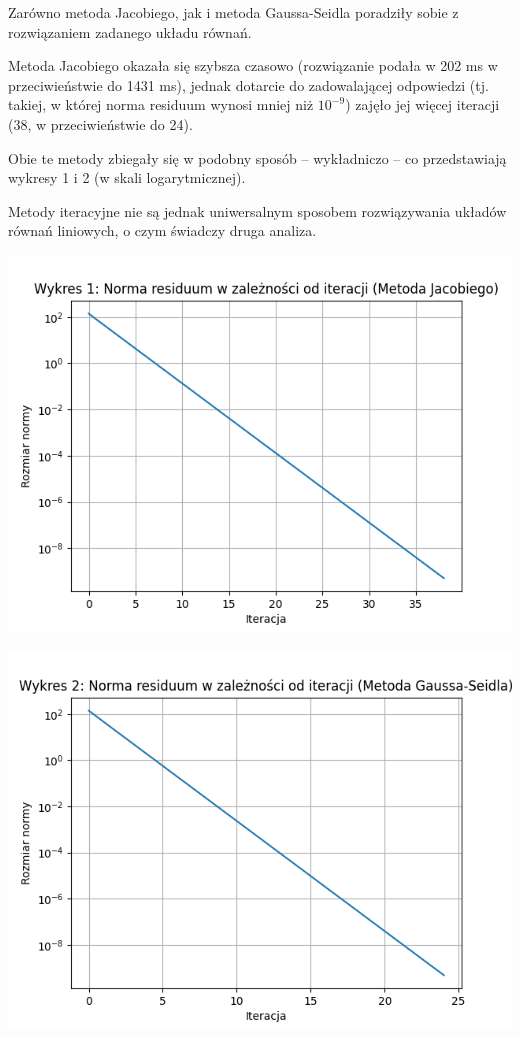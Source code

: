 \documentclass{article}
\begin{document}
Zarówno metoda Jacobiego, jak i metoda Gaussa-Seidla poradziły sobie z rozwiązaniem zadanego układu równań. 

Metoda Jacobiego okazała się szybsza czasowo (rozwiązanie podała w 202 ms w przeciwieństwie do 1431 ms), jednak dotarcie do zadowalającej odpowiedzi (tj. takiej, w której norma residuum wynosi mniej niż $10^{-9}$) zajęło jej więcej iteracji (38, w przeciwieństwie do 24).

Obie te metody zbiegały się w podobny sposób -- wykładniczo -- co przedstawiają wykresy 1 i 2 (w skali logarytmicznej).

Metody iteracyjne nie są jednak uniwersalnym sposobem rozwiązywania układów równań liniowych, o czym świadczy druga analiza.

\includegraphics[scale=0.67]{chart1.png}

\includegraphics[scale=0.67]{chart2.png}
\end{document}
